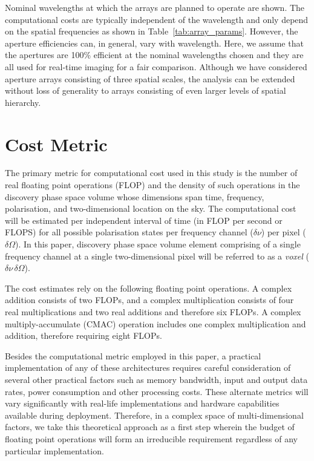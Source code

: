 \documentclass[
  journal=pasa,
  manuscript=article-type,
  year=2020,
  volume=37,
]{cup-journal}
\begin{document}
Nominal wavelengths at which the arrays are planned to operate are shown. The computational costs are typically independent of the wavelength and only depend on the spatial frequencies as shown in Table~\ref{tab:array_params}. However, the aperture efficiencies can, in general, vary with wavelength. Here, we assume that the apertures are 100\% efficient at the nominal wavelengths chosen and they are all used for real-time imaging for a fair comparison. Although we have considered aperture arrays consisting of three spatial scales, the analysis can be extended without loss of generality to arrays consisting of even larger levels of spatial hierarchy. 

\section{Cost Metric} \label{sec:computational-cost}

The primary metric for computational cost used in this study is the number of real floating point operations (FLOP) and the density of such operations in the discovery phase space volume whose dimensions span time, frequency, polarisation, and two-dimensional location on the sky. The computational cost will be estimated per independent interval of time (in FLOP per second or FLOPS) for all possible polarisation states per frequency channel ($\delta\nu$) per pixel ($\delta\Omega$). In this paper, discovery phase space volume element comprising of a single frequency channel at a single two-dimensional pixel will be referred to as a \textit{voxel} ($\delta\nu\,\delta\Omega$).

The cost estimates rely on the following floating point operations. A complex addition consists of two FLOPs, and a complex multiplication consists of four real multiplications and two real additions and therefore six FLOPs. A complex multiply-accumulate (CMAC) operation includes one complex multiplication and addition, therefore requiring eight FLOPs.

Besides the computational metric employed in this paper, a practical implementation of any of these architectures requires careful consideration of several other practical factors such as memory bandwidth, input and output data rates, power consumption and other processing costs.  
These alternate metrics will vary significantly with real-life implementations and hardware capabilities available during deployment. Therefore, in a complex space of multi-dimensional factors, we take this theoretical approach as a first step wherein the budget of floating point operations will form an irreducible requirement regardless of any particular implementation. 
\end{document}
